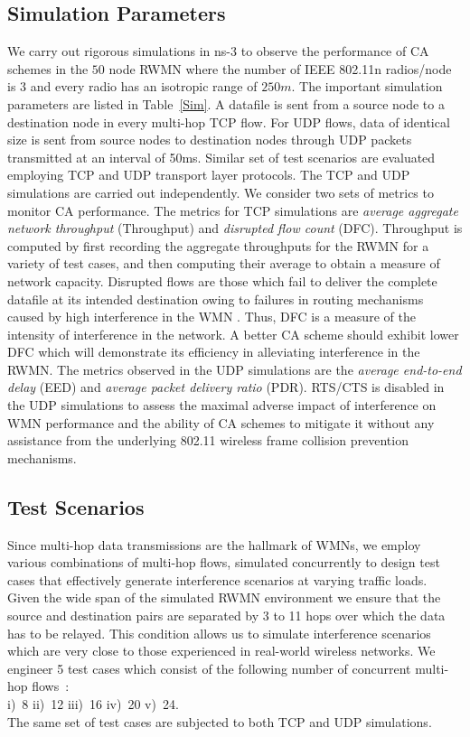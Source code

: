 \documentclass[conference]{IEEEtran}
\begin{document}
\subsection{Simulation Parameters}
We carry out rigorous simulations in ns-3 \cite{NS-3} to observe the performance of CA schemes in the $50$ node RWMN where the number of IEEE 802.11n radios/node is $3$ and every radio has an isotropic range of $250m$. The important simulation parameters are listed in Table~\ref{Sim}. A datafile is sent from a source node to a destination node in every multi-hop TCP flow. For UDP flows, data of identical size is sent from source nodes to destination nodes through UDP packets transmitted at an interval of 50ms. Similar set of test scenarios are evaluated employing TCP and UDP transport layer protocols. The TCP and UDP simulations are carried out independently. We consider two sets of metrics to monitor CA performance. The metrics for TCP simulations are \textit{average aggregate network throughput} (Throughput) and \textit{disrupted flow count} (DFC). Throughput is computed by first recording the aggregate throughputs for the RWMN for a variety of test cases, and then computing their average to obtain a 
measure of network capacity. Disrupted flows are those which fail to deliver the complete datafile at its intended destination owing to failures in routing mechanisms caused by high interference in the WMN 
\cite{Manas}. Thus, DFC is a measure of the intensity of interference in the network. A better CA scheme should exhibit lower DFC which will demonstrate its efficiency in alleviating interference in the RWMN. The metrics observed in the UDP simulations are the \textit{average end-to-end delay} (EED) and \textit{average packet delivery ratio} (PDR). RTS/CTS is disabled in the UDP simulations to assess the maximal adverse impact of interference on WMN performance and the ability of CA schemes to mitigate it without any assistance from the underlying 802.11 wireless frame collision prevention mechanisms. 

\subsection{Test Scenarios}
Since multi-hop data transmissions are the hallmark of WMNs, we employ various combinations of multi-hop flows, simulated concurrently to design test cases that effectively generate interference scenarios at varying traffic loads. Given the wide span of the simulated RWMN environment we ensure that the source and destination pairs are separated by 3 to 11 hops over which the data has to be relayed. This condition allows us to simulate interference scenarios which are very close to those experienced in real-world wireless networks. We engineer 5 test cases which consist of the following number of concurrent multi-hop flows~: \\ \quad i)~8 \quad ii)~12 \quad iii)~16 \quad iv)~20 \quad  v)~24.\\
The same set of test cases are subjected to both TCP and UDP simulations. 
\end{document}
